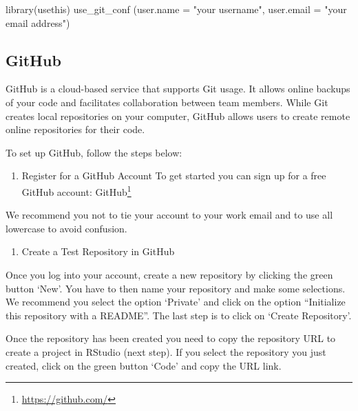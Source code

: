 \documentclass[
]{krantz}
\makeatletter
\newenvironment{Shaded}{\begin{snugshade}}{\end{snugshade}}
\newcommand{\AttributeTok}[1]{\textcolor[rgb]{0.61,0.61,0.61}{#1}}
\newcommand{\FunctionTok}[1]{\textcolor[rgb]{0,0,0}{#1}}
\newcommand{\NormalTok}[1]{#1}
\newcommand{\StringTok}[1]{\textcolor[rgb]{0.5,0.5,0.5}{#1}}
\providecommand{\tightlist}{%
  \setlength{\itemsep}{0pt}\setlength{\parskip}{0pt}}
\renewcommand{\href}[2]{#2\footnote{\url{#1}}}
\newenvironment{kframe}{%
\medskip{}
\setlength{\fboxsep}{.8em}
 \def\at@end@of@kframe{}%
 \ifinner\ifhmode%
  \def\at@end@of@kframe{\end{minipage}}%
  \begin{minipage}{\columnwidth}%
 \fi\fi%
 \def\FrameCommand##1{\hskip\@totalleftmargin \hskip-\fboxsep
 \colorbox{shadecolor}{##1}\hskip-\fboxsep
     \hskip-\linewidth \hskip-\@totalleftmargin \hskip\columnwidth}%
 \MakeFramed {\advance\hsize-\width
   \@totalleftmargin\z@ \linewidth\hsize
   \@setminipage}}%
 {\par\unskip\endMakeFramed%
 \at@end@of@kframe}
\renewenvironment{Shaded}{\begin{kframe}}{\end{kframe}}
\makeatother
\begin{document}
\begin{Shaded}
\begin{Highlighting}[]
\FunctionTok{library}\NormalTok{(usethis)}
\FunctionTok{use\_git\_conf}\NormalTok{ (}\AttributeTok{user.name =} \StringTok{"your username"}\NormalTok{, }\AttributeTok{user.email =} \StringTok{"your email address"}\NormalTok{)}
\end{Highlighting}
\end{Shaded}

\hypertarget{github}{%
\subsection{GitHub}\label{github}}

GitHub is a cloud-based service that supports Git usage. It allows online backups of your code and facilitates collaboration between team members. While Git creates local repositories on your computer, GitHub allows users to create remote online repositories for their code.

To set up GitHub, follow the steps below:

\begin{enumerate}
\def\labelenumi{\arabic{enumi})}
\tightlist
\item
  Register for a GitHub Account
  To get started you can sign up for a free GitHub account: \href{https://github.com/}{GitHub}
\end{enumerate}

We recommend you not to tie your account to your work email and to use all lowercase to avoid confusion.

\begin{enumerate}
\def\labelenumi{\arabic{enumi})}
\setcounter{enumi}{1}
\tightlist
\item
  Create a Test Repository in GitHub
\end{enumerate}

Once you log into your account, create a new repository by clicking the green button `New'. You have to then name your repository and make some selections. We recommend you select the option `Private' and click on the option ``Initialize this repository with a README''. The last step is to click on `Create Repository'.

Once the repository has been created you need to copy the repository URL to create a project in RStudio (next step). If you select the repository you just created, click on the green button `Code' and copy the URL link.
\end{document}

